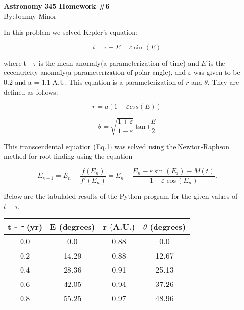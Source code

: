 \documentclass{article}
\begin{document}
\begin{center}
\textbf{\large{Astronomy 345 Homework \#6 }} \\
By:Johnny Minor 
\end{center}

\bigskip 


In this problem we solved Kepler's equation: 

\begin{equation}
t - \tau = E - \varepsilon \sin(E) 
\end{equation}

\noindent where t - $\tau$ is the mean anomaly(a parameterization of time) and $E$ is the eccentricity anomaly(a parameterization of polar angle), and $\varepsilon$ was given to be 0.2 and a = 1.1 A.U. This equation is a parameterization of $r$ and $\theta$. They are defined as follows: 

$$ 
r = a(1-\varepsilon cos(E))
$$

$$
\theta = \sqrt{\frac{1 + \varepsilon}{1 - \varepsilon}} \tan(\frac{E}{2}
$$


This transcendental equation (Eq.1) was solved using the Newton-Raphson method for root finding using the equation 

\begin{equation}
E_{n+1} = E_{n} - \frac{f(E_{n})}{f'(E_{n})} = 
E_{n} - \frac{ E_{n} - \varepsilon \sin(E_{n}) - M(t) }{ 1 - \varepsilon \cos(E_{n})}.
\end{equation}

\noindent Below are the tabulated results of the Python program for the given values of $t-\tau$. 

\begin{center}
\begin{tabular}{ | c | c | c | c | }
	\hline
	t - $\tau$ (yr) & E (degrees) & r (A.U.) & $\theta$ (degrees) \\ \hline 
	0.0 & 0.0 & 0.88 & 0.0 \\ \hline
	0.2 & 14.29 & 0.88 & 12.67 \\ \hline
	0.4 & 28.36 & 0.91 & 25.13 \\ \hline
	0.6 & 42.05 & 0.94 & 37.26 \\ \hline
	0.8 & 55.25 & 0.97 & 48.96 \\ \hline 	
	
	
\end{tabular}


\end{center} 
\end{document}
